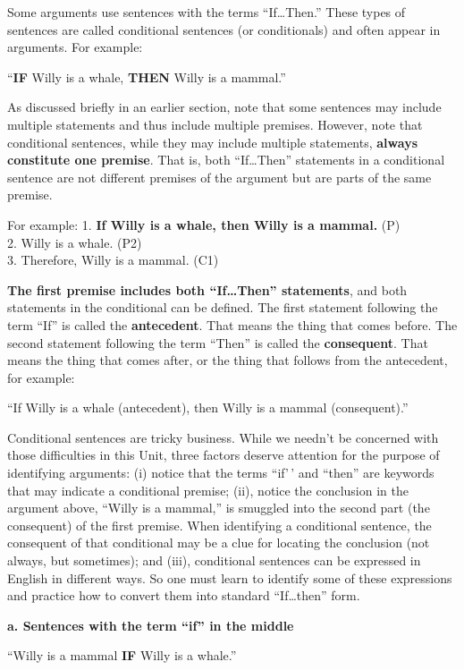 \documentclass[
]{book}
\begin{document}
Some arguments use sentences with the terms ``If\ldots Then.'' These types of sentences are called conditional sentences (or conditionals) and often appear in arguments. For example:

``\textbf{IF} Willy is a whale, \textbf{THEN} Willy is a mammal.''

As discussed briefly in an earlier section, note that some sentences may include multiple statements and thus include multiple premises. However, note that conditional sentences, while they may include multiple statements, \textbf{always constitute one premise}. That is, both ``If\ldots Then'' statements in a conditional sentence are not different premises of the argument but are parts of the same premise.

For example:
1. \textbf{If Willy is a whale, then Willy is a mammal.} (P)\\
2. Willy is a whale. (P2)\\
3. Therefore, Willy is a mammal. (C1)

\textbf{The first premise includes both ``If\ldots Then'' statements}, and both statements in the conditional can be defined. The first statement following the term ``If'' is called the \textbf{antecedent}. That means the thing that comes before. The second statement following the term ``Then'' is called the \textbf{consequent}. That means the thing that comes after, or the thing that follows from the antecedent, for example:

``If Willy is a whale (antecedent), then Willy is a mammal (consequent).''

Conditional sentences are tricky business. While we needn't be concerned with those difficulties in this Unit, three factors deserve attention for the purpose of identifying arguments: (i) notice that the terms ``if'\,' and ``then'' are keywords that may indicate a conditional premise; (ii), notice the conclusion in the argument above, ``Willy is a mammal,'' is smuggled into the second part (the consequent) of the first premise. When identifying a conditional sentence, the consequent of that conditional may be a clue for locating the conclusion (not always, but sometimes); and (iii), conditional sentences can be expressed in English in different ways. So one must learn to identify some of these expressions and practice how to convert them into standard ``If\ldots then'' form.

\textbf{a. Sentences with the term ``if'' in the middle}

``Willy is a mammal \textbf{IF} Willy is a whale.''
\end{document}
